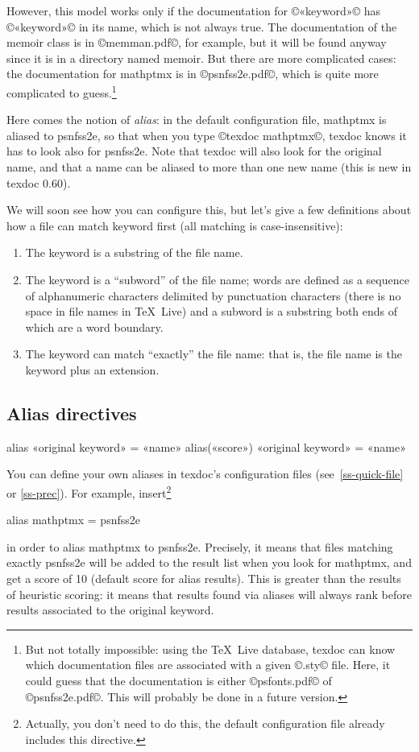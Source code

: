 \documentclass[a4paper, oneside]{scrartcl}
\makeatletter
\newenvironment{htcode}{%
  \SaveVerbatim[samepage, gobble=2]{verbmat}%
  }{%
  \endSaveVerbatim
  \par\medskip\noindent\hspace*{\parindent}%
  \BUseVerbatim{verbmat}%
  \par\medskip\@endpetrue}
\newcommand\texdoc{texdoc\xspace}
\makeatother
\begin{document}
However, this model works only if the documentation for ©«keyword»© has
©«keyword»© in its name, which is not always true. The documentation of the
memoir class is in ©memman.pdf©, for example, but it will be found anyway
since it is in a directory named memoir. But there are more complicated cases:
the documentation for mathptmx is in ©psnfss2e.pdf©, which is quite more
complicated to guess.\footnote{But not totally impossible: using the \TeX\
  Live database, texdoc can know which documentation files are associated with
  a given ©.sty© file. Here, it could guess that the documentation is either
  ©psfonts.pdf© of ©psnfss2e.pdf©. This will probably be done in a future
  version.}

Here comes the notion of \emph{alias}: in the default configuration file,
mathptmx is aliased to psnfss2e, so that when you type ©texdoc mathptmx©,
texdoc knows it has to look also for psnfss2e. Note that texdoc will also look
for the original name, and that a name can be aliased to more than one new
name (this is new in texdoc 0.60).

\medskip

We will soon see how you can configure this, but let's give a few definitions
about how a file can match keyword first (all matching is case-insensitive):
\begin{enumerate}
  \item The keyword is a substring of the file name.
  \item The keyword is a ``subword'' of the file name; words are defined as a
    sequence of alphanumeric characters delimited by punctuation characters
    (there is no space in file names in \TeX\ Live) and a subword is a
    substring both ends of which are a word boundary.
  \item The keyword can match ``exactly'' the file name: that is, the file
    name is the keyword plus an extension.
\end{enumerate}

\subsection{Alias directives}\label{ss-alias}

\begin{htcode}
  alias «original keyword» = «name»
  alias(«score») «original keyword» = «name»
\end{htcode}

You can define your own aliases in \texdoc's configuration files
(see~\ref{ss-quick-file} or \ref{ss-prec}). For example,
insert\footnote{Actually, you don't need to do this, the default configuration
  file already includes this directive.}
\begin{htcode}
  alias mathptmx = psnfss2e
\end{htcode}
in order to alias mathptmx to psnfss2e. Precisely, it means that files
matching exactly psnfss2e will be added to the result list when you look for
mathptmx, and get a score of 10 (default score for alias results). This is
greater than the results of heuristic scoring: it means that results found via
aliases will always rank before results associated to the original keyword.
\end{document}
